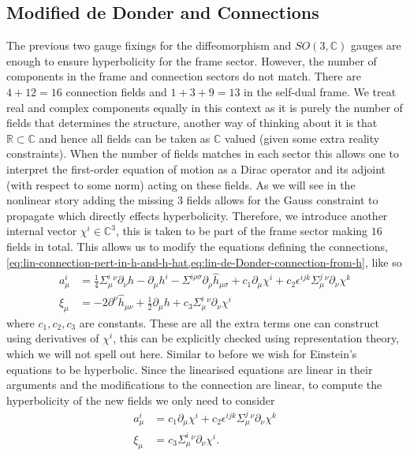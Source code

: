 \documentclass[10pt]{report}
\theoremstyle{definition}
\newcommand{\R}[0]{\mathbb{R}}
\newcommand{\C}[0]{\mathbb{C}}
\newcommand{\E}[0]{\C^3}
\begin{document}
        \subsection{Modified de Donder and Connections}
        The previous two gauge fixings for the diffeomorphism and $SO(3,\C)$ gauges are enough to ensure hyperbolicity for the frame sector. However, the number of components in the frame and connection sectors do not match. There are $4+12=16$ connection fields and $1+3+9=13$ in the self-dual frame. We treat real and complex components equally in this context as it is purely the number of fields that determines the structure, another way of thinking about it is that $\R \subset \C$ and hence all fields can be taken as $\C$ valued (given some extra reality constraints). When the number of fields matches in each sector this allows one to interpret the first-order equation of motion as a Dirac operator and its adjoint (with respect to some norm) acting on these fields. As we will see in the nonlinear story adding the missing $3$ fields allows for the Gauss constraint to propagate which directly effects hyperbolicity.
        Therefore, we introduce another internal vector $\chi^i \in \E$, this is taken to be part of the frame sector making $16$ fields in total. This allows us to modify the equations defining the connections, \cref{eq:lin-connection-pert-in-h-and-h-hat,eq:lin-de-Donder-connection-from-h}, like so
        \begin{align}
            a^i_\mu &= \frac{1}{4} \Sigma^i_\mu{}^\nu \partial_\nu h - \partial_\mu h^i - \Sigma^{i\rho\sigma} \partial_\rho \hat{h}_{\mu\sigma} + c_1 \partial_\mu \chi^i + c_2 \epsilon^{ijk} \Sigma^j_\mu{}^\nu \partial_\nu \chi^k \\
            \xi_\mu &= -2 \partial^\nu \hat{h}_{\mu\nu} + \frac{1}{2}\partial_\mu h + c_3 \Sigma^i_\mu{}^\nu \partial_\nu \chi^i
        \end{align}
        where $c_1,c_2,c_3$ are constants. These are all the extra terms one can construct using derivatives of $\chi^i$, this can be explicitly checked using representation theory, which we will not spell out here. Similar to before we wish for Einstein's equations to be hyperbolic. Since the linearised equations are linear in their arguments and the modifications to the connection are linear, to compute the hyperbolicity of the new fields we only need to consider
        \begin{align}
            a^i_\mu &= c_1 \partial_\mu \chi^i + c_2 \epsilon^{ijk} \Sigma^j_\mu{}^\nu \partial_\nu \chi^k \\ \xi_\mu &= c_3 \Sigma^i_\mu{}^\nu \partial_\nu \chi^i.
        \end{align}
\end{document}
